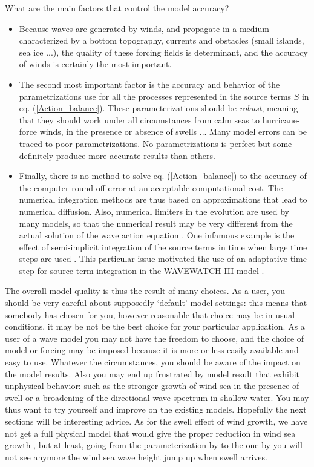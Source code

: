 What are the main factors that control the model accuracy?
\begin{itemize}
\item Because waves are generated by winds, and propagate in a medium characterized by a bottom topography, currents and obstacles (small islands, sea ice ...), 
the quality of these forcing fields is determinant, and the accuracy of winds is certainly the most important. 

\item  The second most important factor is the accuracy and behavior of the parametrizations use for all the processes represented 
in the source terms $S$ in eq. (\ref{Action_balance}). These parameterizations should be \emph{robust}, meaning that they should work under all circumstances from 
calm seas to hurricane-force winds, in the presence or absence of swells ...  Many model errors can be traced to poor parametrizations.  No parametrizations is perfect
but some definitely produce more accurate results than others. 

\item Finally, there is no method to solve eq. (\ref{Action_balance}) to the accuracy of the computer round-off error at an acceptable computational cost. 
The numerical integration methods 
are thus based on approximations that lead to numerical diffusion. Also, numerical limiters in the evolution are used by many models, 
so that the numerical result may be very different from the actual solution of the wave action equation \citep[e.g.][]{Tolman2002b}. 
One infamous example is the effect of semi-implicit integration of the source terms in time when large time steps are used 
\citep{Hargreaves&Annan2000}. This particular issue motivated the use of an adaptative time step for source term integration in the 
WAVEWATCH III model \citep{Tolman&al.2014}. 
\end{itemize}

The overall model quality is thus the result of many choices. As a user, you should be very careful about supposedly `default' model settings:
this means that somebody has chosen for you, however reasonable 
that choice may be in usual conditions, it may be not be the best choice for your particular application.  
As a user of a wave model you may not have the freedom to choose, and the choice of model or forcing may be imposed because it is more or less easily available 
and easy to use. Whatever the circumstances, you should be aware  of the impact on the model results. 
Also  you may end up frustrated by model result that exhibit unphysical behavior: such as the stronger growth of wind sea in the presence of swell or 
a broadening of  the directional wave spectrum in shallow water. You  may thus want 
to try yourself and improve on the existing models. Hopefully the next sections will be interesting advice. As for the swell effect of wind growth, 
we have not get a full physical model that would give the proper reduction in wind sea growth \citep{Garcia&al.2012}, but at least, 
going from the parameterization by \cite{Janssen&al.1994} to the one by \cite{Ardhuin&al.2010} you will not see anymore the 
wind sea wave height jump up when swell arrives. 

